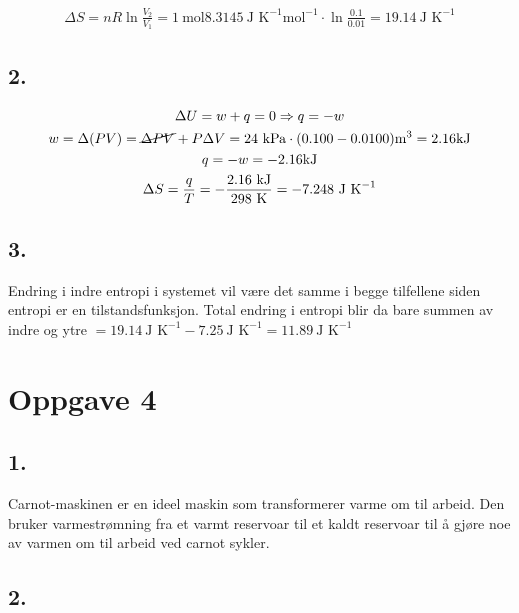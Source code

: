 \begin{gather*}
	\Delta S = n R \ln{\frac{V_2}{V_1}} =
	1\ \text{mol} 8.3145 \ \text{J K}^{-1} \text{mol}^{-1} \cdot
	\ln{\frac{0.1}{0.01}} = 19.14\ \text{J K}^{-1}
\end{gather*}


\subsection*{2.}

\begin{gather*}
	\Delta U = w + q = 0 \Rightarrow q = -w
	\\
	w = \Delta (PV) = \cancel{\Delta P V} + P \Delta V =
	24\ \text{kPa} \cdot (0.100 - 0.0100) \text{m}^3 = 2.16 \text{kJ}
	\\
	q = - w = -2.16 \text{kJ}
	\\
	\Delta S = \frac{q}{T} = - \frac{2.16\ \text{kJ}}{298\ \text{K}} =
	-7.248\ \text{J K}^{-1}
\end{gather*}


\subsection*{3.}

Endring i indre entropi i systemet vil være det samme i begge tilfellene siden entropi er en tilstandsfunksjon. Total endring i entropi blir da bare summen av indre og ytre \(= 19.14\ \text{J K}^{-1} - 7.25\ \text{J K}^{-1} = 11.89\ \text{J K}^{-1}\)


\section*{Oppgave 4}

\subsection*{1.}

Carnot-maskinen er en ideel maskin som transformerer varme om til arbeid. Den bruker varmestrømning fra et varmt reservoar til et kaldt reservoar til å gjøre noe av varmen om til arbeid ved carnot sykler.


\subsection*{2.}

